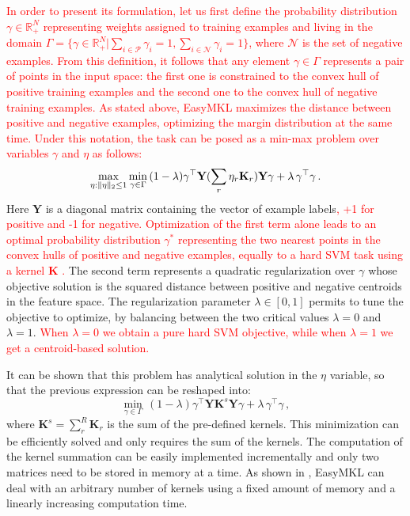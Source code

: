 \documentclass[twocolumn]{bmcart}%
\begin{document}
\textcolor{red}{In order to present its formulation, let us first define the probability distribution $\gamma \in \mathbb{R}^{N}_{+}$ representing weights assigned to training examples and living in the domain $\Gamma = \{ \gamma \in \mathbb{R}^{N}_{+} | \sum_{i \in \mathcal{P}} \gamma_{i}=1, \sum_{i \in \mathcal{N}} \gamma_{i}=1\}$, where $\mathcal{N}$ is the set of negative examples. From this definition, it follows that any element $\gamma \in \Gamma$ represents a pair of points in the input space: the first one is constrained to the convex hull of positive training examples and the second one to the convex hull of negative training examples. As stated above, EasyMKL maximizes the distance between positive and negative examples, optimizing the margin distribution at the same time. Under this notation, the task can be posed as a min-max problem over variables $\gamma$ and $\eta$ as follows:}
\begin{equation}
\max\limits_{\eta:\| \eta \|_2 \leq 1}\min\limits_{\gamma \in \Gamma}\, (1 - \lambda) \gamma^{\top}\\ \textbf{Y} (\sum_{r}{\eta_{r} \textbf{K}_{r}})\textbf{Y} \gamma + \lambda \, \gamma^{\top} \gamma \, .
\end{equation}
Here $\textbf{Y}$ is a diagonal matrix containing the vector of example labels\textcolor{red}{, +1 for positive and -1 for negative. Optimization of the first term alone leads to an optimal probability distribution $\gamma^{*}$ representing the two nearest points in the convex hulls of positive and negative examples, equally to a hard SVM task using a kernel $\textbf{K}$ \cite{komd}.} The second term represents a quadratic regularization over $\gamma$ whose objective solution is the squared distance between positive and negative centroids in the feature space. The regularization parameter $\lambda \in [0,1]$ permits to tune the objective to optimize, by balancing between the two critical values $\lambda=0$ and $\lambda=1$. \textcolor{red}{When $\lambda=0$ we obtain a pure hard SVM objective, while when $\lambda=1$ we get a centroid-based solution.}

It can be shown that this problem has analytical solution in the $\eta$ variable, so that the previous expression can be reshaped into: 
\begin{equation}\label{easymkl_quad_opt}
\min \limits_{\gamma \in \Gamma} \, (1 - \lambda) \gamma^{\top} \textbf{Y} \textbf{K}^{s} \textbf{Y} \gamma + \lambda \, \gamma^{\top} \gamma \, ,
\end{equation}
where $\textbf{K}^{s}=\sum_{r}^{R}\textbf{K}_r$ is the sum of the pre-defined kernels. This minimization can be efficiently solved and only requires the sum of the kernels. The computation of the kernel summation can be easily implemented incrementally and only two matrices need to be stored in memory at a time. As shown in \cite{easymkl}, EasyMKL can deal with an arbitrary number of kernels using a fixed amount of memory and a linearly increasing computation time.
\end{document}
